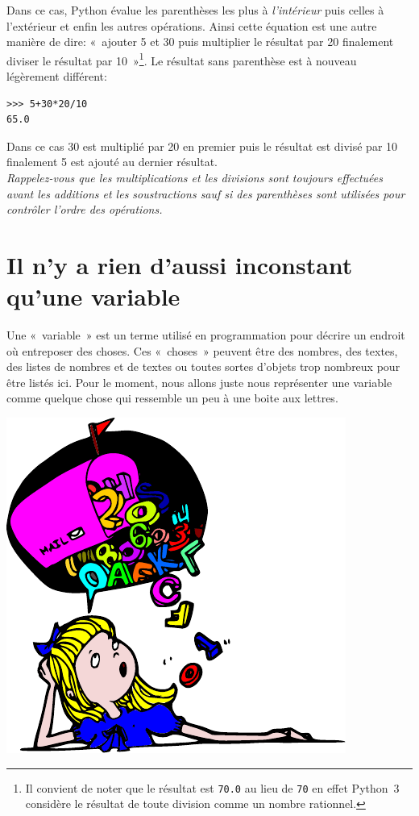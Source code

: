 Dans ce cas, Python évalue les parenthèses les plus à \emph{l'intérieur} puis celles à l'extérieur et enfin les autres opérations. Ainsi cette équation est une autre manière de dire: «~ajouter 5 et 30 puis multiplier le résultat par 20 finalement diviser le résultat par 10~»\footnote{Il convient de noter que le résultat est \texttt{70.0} au lieu de \texttt{70} en effet Python~3 considère le résultat de toute division comme un nombre rationnel.}. Le résultat sans parenthèse est à nouveau légèrement différent: 

\begin{Verbatim}[frame=single,rulecolor=\color{mbleu}, label=à taper]
>>> 5+30*20/10
65.0
\end{Verbatim}

Dans ce cas 30 est multiplié par 20 en premier puis le résultat est divisé par 10 finalement 5 est ajouté au dernier résultat.\\


\emph{Rappelez-vous que les multiplications et les divisions sont toujours effectuées avant les additions et les soustractions sauf si des parenthèses sont utilisées pour contrôler l'ordre des opérations.}


\section{Il n'y a rien d'aussi inconstant qu'une variable}

Une «~variable~» est un terme utilisé en programmation pour décrire un endroit où entreposer des choses. Ces «~choses~» peuvent être des nombres, des textes, des listes de nombres et de textes ou toutes sortes d'objets trop nombreux pour être listés ici. Pour le moment, nous allons juste nous représenter une variable comme quelque chose qui ressemble un peu à une boite aux lettres.

\begin{center}
\includegraphics[scale=1]{images/boite.pdf} 
\end{center}

